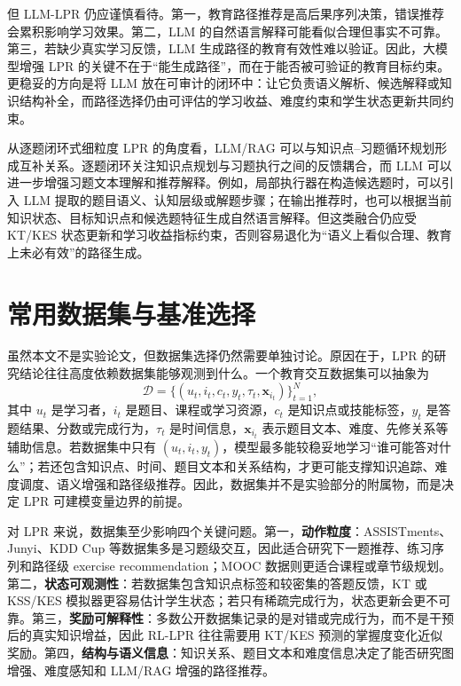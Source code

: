 \documentclass[UTF8,a4paper,zihao=-4]{ctexart}
\begin{document}
但 LLM-LPR 仍应谨慎看待。第一，教育路径推荐是高后果序列决策，错误推荐会累积影响学习效果。第二，LLM 的自然语言解释可能看似合理但事实不可靠。第三，若缺少真实学习反馈，LLM 生成路径的教育有效性难以验证。因此，大模型增强 LPR 的关键不在于“能生成路径”，而在于能否被可验证的教育目标约束。更稳妥的方向是将 LLM 放在可审计的闭环中：让它负责语义解析、候选解释或知识结构补全，而路径选择仍由可评估的学习收益、难度约束和学生状态更新共同约束。

从逐题闭环式细粒度 LPR 的角度看，LLM/RAG 可以与知识点--习题循环规划形成互补关系。逐题闭环关注知识点规划与习题执行之间的反馈耦合，而 LLM 可以进一步增强习题文本理解和推荐解释。例如，局部执行器在构造候选题时，可以引入 LLM 提取的题目语义、认知层级或解题步骤；在输出推荐时，也可以根据当前知识状态、目标知识点和候选题特征生成自然语言解释。但这类融合仍应受 KT/KES 状态更新和学习收益指标约束，否则容易退化为“语义上看似合理、教育上未必有效”的路径生成。

\section{常用数据集与基准选择}

虽然本文不是实验论文，但数据集选择仍然需要单独讨论。原因在于，LPR 的研究结论往往高度依赖数据集能够观测到什么。一个教育交互数据集可以抽象为
\begin{equation}
\mathcal{D}=\{(u_t,i_t,c_t,y_t,\tau_t,\mathbf{x}_{i_t})\}_{t=1}^{N},
\end{equation}
其中 $u_t$ 是学习者，$i_t$ 是题目、课程或学习资源，$c_t$ 是知识点或技能标签，$y_t$ 是答题结果、分数或完成行为，$\tau_t$ 是时间信息，$\mathbf{x}_{i_t}$ 表示题目文本、难度、先修关系等辅助信息。若数据集中只有 $(u_t,i_t,y_t)$，模型最多能较稳妥地学习“谁可能答对什么”；若还包含知识点、时间、题目文本和关系结构，才更可能支撑知识追踪、难度调度、语义增强和路径级推荐。因此，数据集并不是实验部分的附属物，而是决定 LPR 可建模变量边界的前提。

对 LPR 来说，数据集至少影响四个关键问题。第一，\textbf{动作粒度}：ASSISTments、Junyi、KDD Cup 等数据集多是习题级交互，因此适合研究下一题推荐、练习序列和路径级 exercise recommendation；MOOC 数据则更适合课程或章节级规划。第二，\textbf{状态可观测性}：若数据集包含知识点标签和较密集的答题反馈，KT 或 KSS/KES 模拟器更容易估计学生状态；若只有稀疏完成行为，状态更新会更不可靠。第三，\textbf{奖励可解释性}：多数公开数据集记录的是对错或完成行为，而不是干预后的真实知识增益，因此 RL-LPR 往往需要用 KT/KES 预测的掌握度变化近似奖励。第四，\textbf{结构与语义信息}：知识关系、题目文本和难度信息决定了能否研究图增强、难度感知和 LLM/RAG 增强的路径推荐。
\end{document}
